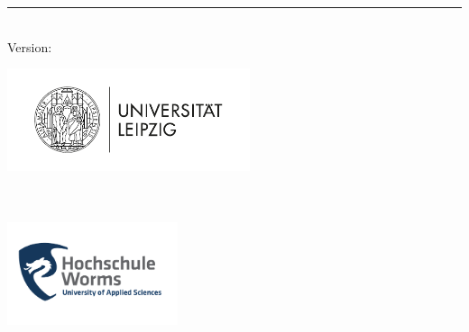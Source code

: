 %
\begin{titlepage}
	\flushright
	\hfill
	\vfill
	{\LARGE\thesisTitle \par}
	\rule[5pt]{\textwidth}{.4pt} \par
	{\Large\thesisName}
	\vfill
	\textit{\large\thesisDate} \\
	Version: \thesisVersion
\end{titlepage}


\begin{titlepage}
	\tgherosfont
	\centering

	\begin{multicols}{2}
    
        \begin{center}
			\includegraphics[height=3cm]{gfx/Leipzig_logo} \\[2mm]
			\textsf{\thesisUniversityDepartment} \\
			\textsf{\thesisUniversityGroup} \\
		\end{center}

        \begin{center}
			\includegraphics[height=3cm]{gfx/HS_Worms_Logo_farbig_RGB} \\[2mm]
			\textsf{\supervisionUniversityDepartment} \\
			\textsf{\supervisionUniversityGroup} \\
		\end{center}
    
    \end{multicols}

	\vfill
	{\large \thesisSubject} \\[5mm]
	{\LARGE \color{ctcolortitle}\textbf{\thesisTitle} \\[10mm]}
	{\Large \thesisName} \\


\end{titlepage}
